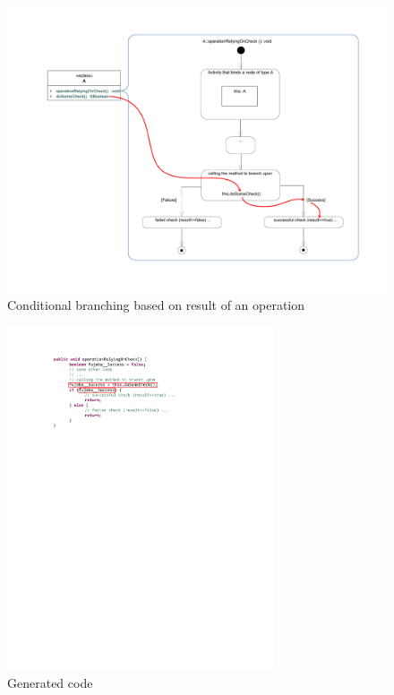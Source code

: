 \begin{figure}[htp]
\begin{center}
  \includegraphics[width=1\textwidth]{pics/advancedTopics/branching/SDM_with_branch}
  \caption{Conditional branching based on result of an operation}
  \label{fig:cond_branch_on_op}
\end{center}
\end{figure}

\begin{figure}[htp]
\begin{center}
  \includegraphics[width=0.7\textwidth]{pics/advancedTopics/branching/generated_code}
  \caption{Generated code}
  \label{fig:cond_branch_on_op_code}
\end{center}
\end{figure}

